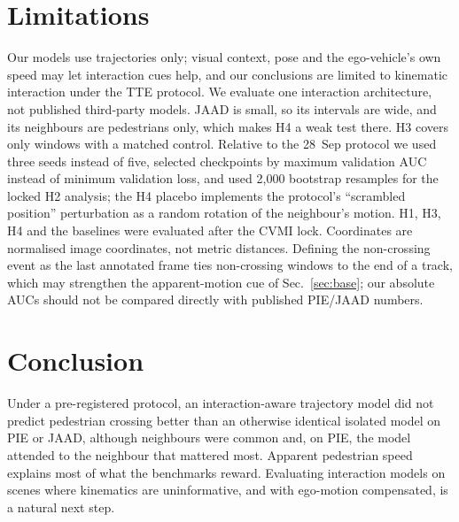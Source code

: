 \documentclass[conference]{IEEEtran}
\begin{document}
\section{Limitations}\label{sec:lim}
Our models use trajectories only; visual context, pose and the ego-vehicle's own speed may let interaction cues help, and our conclusions are limited to kinematic interaction under the TTE protocol. We evaluate one interaction architecture, not published third-party models. JAAD is small, so its intervals are wide, and its neighbours are pedestrians only, which makes H4 a weak test there. H3 covers only windows with a matched control. Relative to the 28~Sep protocol we used three seeds instead of five, selected checkpoints by maximum validation AUC instead of minimum validation loss, and used 2{,}000 bootstrap resamples for the locked H2 analysis; the H4 placebo implements the protocol's ``scrambled position'' perturbation as a random rotation of the neighbour's motion. H1, H3, H4 and the baselines were evaluated after the CVMI lock. Coordinates are normalised image coordinates, not metric distances. Defining the non-crossing event as the last annotated frame ties non-crossing windows to the end of a track, which may strengthen the apparent-motion cue of Sec.~\ref{sec:base}; our absolute AUCs should not be compared directly with published PIE/JAAD numbers.

\section{Conclusion}
Under a pre-registered protocol, an interaction-aware trajectory model did not predict pedestrian crossing better than an otherwise identical isolated model on PIE or JAAD, although neighbours were common and, on PIE, the model attended to the neighbour that mattered most. Apparent pedestrian speed explains most of what the benchmarks reward. Evaluating interaction models on scenes where kinematics are uninformative, and with ego-motion compensated, is a natural next step.



\end{document}
